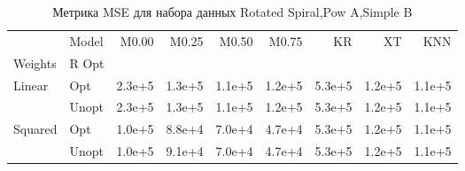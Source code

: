 \begin{table}
\caption{Метрика MSE для набора данных Rotated Spiral,Pow A,Simple B}
\label{tab:MSE_Rotated Spiral,Pow A,Simple B}
\begin{tabular}{llrrrrrrr}
\toprule
 & Model & M0.00 & M0.25 & M0.50 & M0.75 & KR & XT & KNN \\
Weights & R Opt &  &  &  &  &  &  &  \\
\midrule
\multirow[t]{2}{*}{Linear} & Opt & 2.3e+5 & 1.3e+5 & 1.1e+5 & 1.2e+5 & 5.3e+5 & 1.2e+5 & 1.1e+5 \\
 & Unopt & 2.3e+5 & 1.3e+5 & 1.1e+5 & 1.2e+5 & 5.3e+5 & 1.2e+5 & 1.1e+5 \\

\multirow[t]{2}{*}{Squared} & Opt & 1.0e+5 & 8.8e+4 & 7.0e+4 & 4.7e+4 & 5.3e+5 & 1.2e+5 & 1.1e+5 \\
 & Unopt & 1.0e+5 & 9.1e+4 & 7.0e+4 & 4.7e+4 & 5.3e+5 & 1.2e+5 & 1.1e+5 \\

\bottomrule
\end{tabular}
\end{table}
